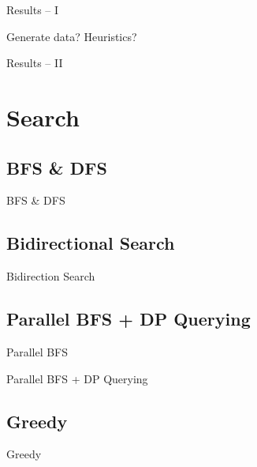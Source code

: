 \documentclass[t,10pt,
mathserif,xcolor=dvipsnames]{beamer}
\begin{document}
\begin{myframe}{Results -- I}

  Generate data?
  Heuristics?
  
\end{myframe}

\begin{myframe}{Results -- II}

\end{myframe}


\section{Search}


\subsection{BFS \& DFS}

\begin{myframe}{BFS \& DFS}

\end{myframe}

\subsection{Bidirectional Search}

\begin{myframe}{Bidirection Search}

\end{myframe}

\subsection{Parallel BFS + DP Querying}

\begin{myframe}{Parallel BFS}

\end{myframe}

\begin{myframe}{Parallel BFS + DP Querying}

\end{myframe}

\subsection{Greedy}

\begin{myframe}{Greedy}

\end{myframe}
\end{document}
